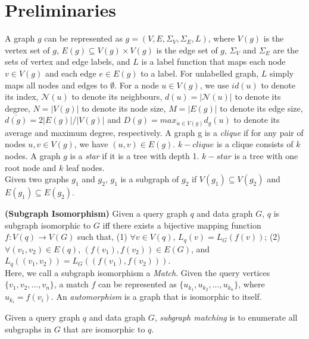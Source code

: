 \section{Preliminaries}
\label{sec:prelim}
A graph $g$ can be represented as $g=(V, E, \Sigma_V,\Sigma_E, L)$, where $V(g)$ is the vertex set of $g$, $E(g) \subseteq V(g) \times V(g)$ is the edge set of $g$, $\Sigma_V$ and $\Sigma_E$ are the sets of vertex and edge labels, and $L$ is a label function that maps each node $v\in V(g)$ and each edge $e \in E(g)$ to a label. For unlabelled graph, $L$ simply maps all nodes and edges to $\emptyset$. For a node $u\in V(g)$, we use $id(u)$ to denote its index, $\mathcal{N}(u)$ to denote its neighbours, $d(u)=|\mathcal{N}(u)|$ to denote its degree, $N=|V(g)|$ to denote its node size, $M=|E(g)|$ to denote its edge size, $\overline{d(g)} = 2|E(g)|/|V(g)|$ and $D(g) = max_{u\in V(g)}d_g(u)$ to denote its average and maximum degree, respectively. A graph g is a \textit{clique} if for any pair of nodes $u, v \in V(g)$, we have $(u, v) \in E(g)$. $k-clique$ is a clique consists of $k$ nodes. A graph $g$ is a \textit{star} if it is a tree with depth 1. $k-star$ is a tree with one root node and $k$ leaf nodes.\\

Given two graphs $g_1$ and $g_2$, $g_1$ is a subgraph of $g_2$ if $V(g_1) \subseteq V(g_2)$ and $E(g_1) \subseteq E(g_2)$.\\

\begin{definition}
\label{def:isomorphism}{\textbf{(Subgraph Isomorphism)}} Given a query graph $q$ and data graph $G$, $q$ is subgraph isomorphic to $G$ iff there exists a bijective mapping function $f: V(q) \rightarrow V(G)$ such that, (1) $\forall v \in V(q)$, $L_q(v) = L_{G}(f(v))$; (2) $\forall (v_1, v_2) \in E(q)$, $(f(v_1), f(v_2)) \in E(G)$, and $L_q((v_1, v_2)) = L_{G}((f(v_1), f(v_2)))$. \\

Here, we call a subgraph isomorphism a \textit{Match}. Given the query vertices $\{v_1, v_2, ..., v_n\}$, a match $f$ can be represented as $\{u_{k_1}, u_{k_2}, ..., u_{k_n}\}$, where $u_{k_i} = f(v_i)$. An \textit{automorphism} is a graph that is isomorphic to itself.
\end{definition}

 Given a query graph $q$ and data graph $G$, \textit{subgraph matching} is to enumerate all subgraphs in $G$ that are isomorphic to $q$.\\


